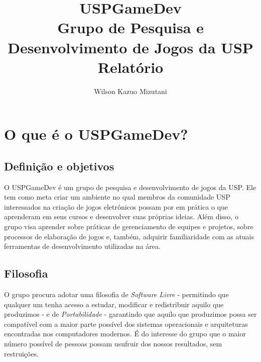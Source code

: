 \documentclass[12pt,onecolumn,a4paper]{article}
\begin{document}
\begin{titlepage}

    \title{
        \bf
        \Huge  USPGameDev \\
        \large Grupo de Pesquisa e Desenvolvimento de Jogos da USP \\
        \LARGE Relatório
    }
    \author{Wilson Kazuo Mizutani}
    
    \maketitle
    
    \thispagestyle{empty}
    
\end{titlepage}


\tableofcontents

\clearpage

\pagestyle{myheadings}



\section{\LARGE O que é o USPGameDev?}

    \subsection{Definição e objetivos}
        O USPGameDev é um grupo de pesquisa e desenvolvimento de jogos da USP. Ele tem como meta
        criar um ambiente no qual membros da comunidade USP interessados na criação de jogos
        eletrônicos possam por em prática o que aprenderam em seus cursos e desenvolver suas
        próprias ideias. Além disso, o grupo visa aprender sobre práticas de gerenciamento de
        equipes e projetos, sobre processos de elaboração de jogos e, também, adquirir familiaridade
        com as atuais ferramentas de desenvolvimento utilizadas na área.
    
    \subsection{Filosofia}
        O grupo procura adotar uma filosofia de {\it Software Livre} - permitindo que qualquer um
        tenha acesso a estudar, modificar e redistribuir aquilo que produzimos - e de {\it
        Portabilidade} - garantindo que aquilo que produzimos possa ser compatível com a maior parte
        possível dos sistemas operacionais e arquiteturas encontradas nos computadores modernos. É
        do interesse do grupo que o maior número possível de pessoas possam usufruir dos nossos
        resultados, sem restruições.
    
\end{document}
